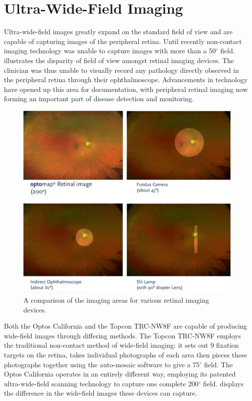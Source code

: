 \section{Ultra-Wide-Field Imaging}

Ultra-wide-field images greatly expand on the standard field of view and are
capable of capturing images of the peripheral retina. Until recently
non-contact imaging technology was unable to capture images with more
than a 50$^\circ$ field.  illustrates the disparity of
field of view amongst retinal imaging devices. The clinician was thus
unable to visually record any pathology directly observed in the peripheral
retina through their ophthalmoscope. Advancements in technology have opened
up this area for documentation, with peripheral retinal imaging now forming
an important part of disease detection and monitoring.\cite{8_sides_media_2015}

\begin{figure}[htbp]
\centering
\includegraphics{figures/uwfcomparison}
\caption{A comparison of the imaging areas for various retinal imaging devices.}
\label{fig:uwfc}
   \end{figure}

Both the Optos California and the Topcon TRC-NW8F are capable of producing
wide-field images through differing methods. The Topcon TRC-NW8F employs
the traditional non-contact method of wide-field imaging: it sets out 9
fixation targets on the retina, takes individual photographs of each area
then pieces these photographs together using the auto-mosaic software to
give a 75$^\circ$ field. The Optos California operates in an entirely
different way, employing its patented ultra-wide-field scanning technology
to capture one complete 200$^\circ$ field.  displays the
difference in the wide-field images these devices can capture.

